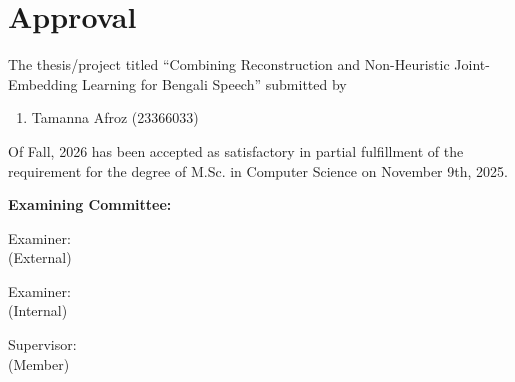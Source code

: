 \section*{Approval}

The thesis/project titled “Combining Reconstruction and Non-Heuristic Joint-Embedding Learning for Bengali Speech” submitted by 
\begin{enumerate}
  \item Tamanna Afroz (23366033)
\end{enumerate}

Of Fall, 2026 has been accepted as satisfactory in partial fulfillment of the requirement for the degree of M.Sc. in Computer Science on November 9th, 2025.

\vspace{0.5cm}
\textbf{Examining Committee:}

\vspace{1cm}

Examiner:\\
(External)
\begin{center}
    \hspace{7cm}  \hspace{1cm} 
\end{center}

Examiner:\\
(Internal)
\begin{center}
    \hspace{7cm}  \hspace{1cm} 
\end{center}

Supervisor:\\
(Member)
\begin{center}
    \hspace{7cm}  \hspace{1cm} 
\end{center}

